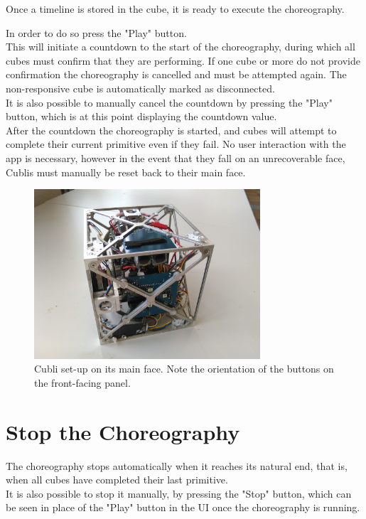 Once a timeline is stored in the cube, it is ready to execute the choreography. 

In order to do so press the "Play" button.\\

This will initiate a countdown to the start of the choreography, during which all cubes must confirm that they are performing. If one cube or more do not provide confirmation the choreography is cancelled and must be attempted again. The non-responsive cube is automatically marked as disconnected.\\

It is also possible to manually cancel the countdown by pressing the "Play" button, which is at this point displaying the countdown value.\\

After the countdown the choreography is started, and cubes will attempt to complete their current primitive even if they fail. No user interaction with the app is necessary, however in the event that they fall on an unrecoverable face, Cublis must manually be reset back to their main face.

\begin{figure}[ht]
   \centering
   \includegraphics[width=0.75\textwidth]{img/MainFace.jpg}
   \caption{Cubli set-up on its main face. Note the orientation of the buttons on the front-facing panel.}
   \label{img:MainFace}
\end{figure}


\section{Stop the Choreography}

The choreography stops automatically when it reaches its natural end, that is, when all cubes have completed their last primitive. \\

It is also possible to stop it manually, by pressing the "Stop" button, which can be seen in place of the "Play" button in the UI once the choreography is running.
